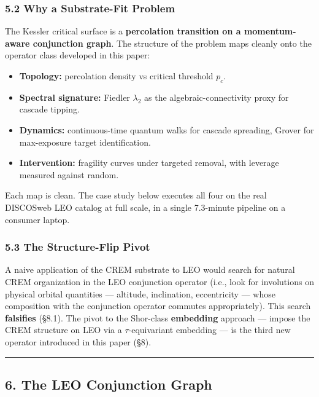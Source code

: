 \documentclass[
]{article}
\providecommand{\tightlist}{%
  \setlength{\itemsep}{0pt}\setlength{\parskip}{0pt}}
\begin{document}
\subsubsection{5.2 Why a Substrate-Fit
Problem}\label{why-a-substrate-fit-problem}

The Kessler critical surface is a \textbf{percolation transition on a
momentum-aware conjunction graph}. The structure of the problem maps
cleanly onto the operator class developed in this paper:

\begin{itemize}
\tightlist
\item
  \textbf{Topology:} percolation density vs critical threshold \(p_c\).
\item
  \textbf{Spectral signature:} Fiedler \(\lambda_2\) as the
  algebraic-connectivity proxy for cascade tipping.
\item
  \textbf{Dynamics:} continuous-time quantum walks for cascade
  spreading, Grover for max-exposure target identification.
\item
  \textbf{Intervention:} fragility curves under targeted removal, with
  leverage measured against random.
\end{itemize}

Each map is clean. The case study below executes all four on the real
DISCOSweb LEO catalog at full scale, in a single 7.3-minute pipeline on
a consumer laptop.

\subsubsection{5.3 The Structure-Flip
Pivot}\label{the-structure-flip-pivot}

A naive application of the CREM substrate to LEO would search for
natural CREM organization in the LEO conjunction operator (i.e., look
for involutions on physical orbital quantities --- altitude,
inclination, eccentricity --- whose composition with the conjunction
operator commutes appropriately). This search \textbf{falsifies} (§8.1).
The pivot to the Shor-class \textbf{embedding} approach --- impose the
CREM structure on LEO via a \(\tau\)-equivariant embedding --- is the
third new operator introduced in this paper (§8).

\begin{center}\rule{0.5\linewidth}{0.5pt}\end{center}

\subsection{6. The LEO Conjunction
Graph}\label{the-leo-conjunction-graph}
\end{document}

